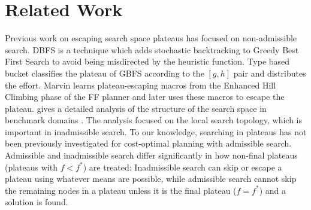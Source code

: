 \section{Related Work}
\label{sec-4}

Previous work on escaping search space plateaus has focused on
non-admissible search.  DBFS \cite{imai2011novel} is a technique which
adds stochastic backtracking to Greedy Best First Search to avoid
being misdirected by the heuristic function. Type based bucket
\cite{xie14type} classifies the plateau of GBFS according to the
$[g,h]$ pair and distributes the effort.  Marvin \cite{Coles07} learns plateau-escaping macros
from the Enhanced Hill Climbing phase of the FF planner
\cite{Hoffmann01} and later uses these macros to escape the plateau.
\citeauthor{Hoffmann05} gives a detailed analysis of the
structure of the search space in benchmark domains 
\cite{Hoffmann05,Hoffmann14}. 
The analysis focused on the local search topology, which is
important in inadmissible search.
% 
To our knowledge, searching in plateaus has not been
previously investigated for cost-optimal planning with admissible
search.
Admissible and inadmissible search differ significantly in how non-final plateaus (plateaus with $f < f^*$) are treated:
Inadmissible search can skip or escape a plateau using whatever means are possible, while
admissible search cannot skip the remaining nodes in a plateau unless it
is the final plateau ($f=f^*$) and a solution is found. %



